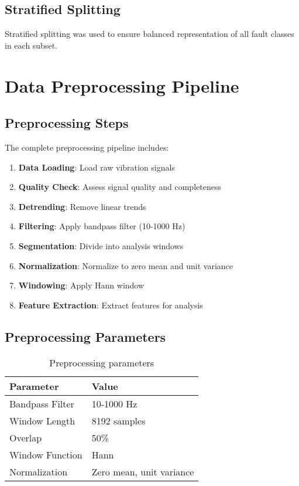 \subsection{Stratified Splitting}

Stratified splitting was used to ensure balanced representation of all fault classes in each subset.

\section{Data Preprocessing Pipeline}

\subsection{Preprocessing Steps}

The complete preprocessing pipeline includes:

\begin{enumerate}
    \item \textbf{Data Loading}: Load raw vibration signals
    \item \textbf{Quality Check}: Assess signal quality and completeness
    \item \textbf{Detrending}: Remove linear trends
    \item \textbf{Filtering}: Apply bandpass filter (10-1000 Hz)
    \item \textbf{Segmentation}: Divide into analysis windows
    \item \textbf{Normalization}: Normalize to zero mean and unit variance
    \item \textbf{Windowing}: Apply Hann window
    \item \textbf{Feature Extraction}: Extract features for analysis
\end{enumerate}

\subsection{Preprocessing Parameters}

\begin{table}[H]
\centering
\caption{Preprocessing parameters}
\label{tab:preprocessing_params}
\begin{tabular}{@{}ll@{}}
\toprule
Parameter & Value \\
\midrule
Bandpass Filter & 10-1000 Hz \\
Window Length & 8192 samples \\
Overlap & 50\% \\
Window Function & Hann \\
Normalization & Zero mean, unit variance \\
\bottomrule
\end{tabular}
\end{table}


